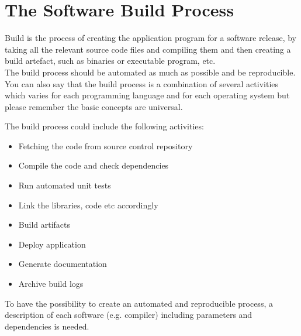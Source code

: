 \chapter{The Software Build Process}

Build is the process of creating the application program for a
software release, by taking all the relevant source code files
and compiling them and then creating a build artefact, such as
binaries or executable program, etc.\\

The build process should be automated as much as possible and
be reproducible.\\

You can also say that the build process is a combination of
several activities which varies for each programming language
and for each operating system but please remember the basic
concepts are universal.\\

\vspace{3mm}

The build process could include the following activities:


\begin{itemize}
\item Fetching the code from source control repository
\item Compile the code and check dependencies
\item Run automated unit tests
\item Link the libraries, code etc accordingly
\item Build artifacts
\item Deploy application
\item Generate documentation
\item Archive build logs
\end{itemize}

To have the possibility to create an automated and reproducible
process, a description of each software (e.g. compiler) including
parameters and dependencies is needed.\\

\vspace{3mm}

